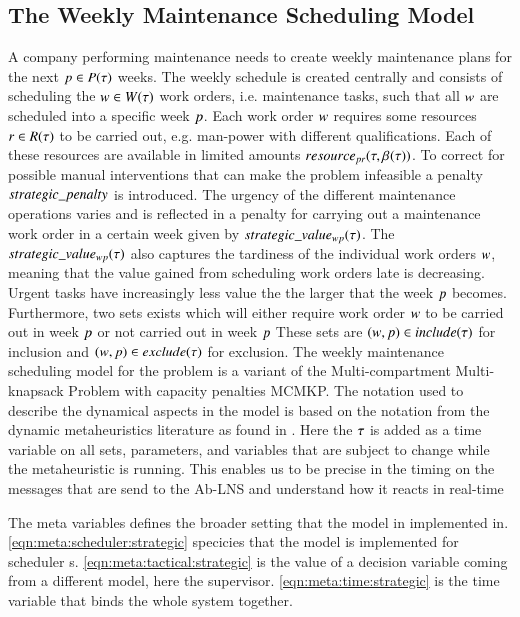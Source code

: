 \subsection{The Weekly Maintenance Scheduling Model}
A company performing maintenance needs to create weekly maintenance plans for
the next $p \in P(\tau)$ weeks. The weekly schedule is created
centrally and consists of scheduling the $\ElementWorkOrder \in \SetWorkOrder$
work orders, i.e. maintenance tasks, such that all $w$
are scheduled into a specific week $p$. Each work order $
w$ requires some resources $r \in R(\tau)$
to be carried out, e.g. man-power with different qualifications. Each of these
resources are available in limited amounts $resource_{pr}(\tau, \beta_{}(\tau))$. To correct
for possible manual interventions that can make the problem infeasible a penalty
$strategic\_penalty$ is introduced. The urgency of the different maintenance operations
varies and is reflected in a penalty for carrying out a maintenance work
order in a certain week given by $strategic\_value_{w p}(\tau)$. The $strategic\_value_{w p}(\tau)$ also 
captures the tardiness of the individual work orders $w$, meaning that
the value gained from scheduling work orders late is decreasing. Urgent tasks have
increasingly less value the the larger that the week $p$ becomes. 
Furthermore, two sets exists which will either require work order $w$ to be carried
out in week $p$ or not carried out in week $p$ 
These sets are $(w,p) \in
include(\tau)$ for inclusion and  $(w, p) \in
exclude(\tau)$ for exclusion. The weekly maintenance scheduling model for the problem 
is a variant of the  Multi-compartment Multi-knapsack Problem with capacity penalties MCMKP. 
The notation used to describe the dynamical aspects in the model is based on the notation 
from the dynamic metaheuristics literature as found in \cite{yangMetaheuristicsDynamicCombinatorial2013}. 
Here the $\tau$ is added as a time variable on all sets, parameters, and variables that are
subject to change while the metaheuristic is running. This enables us to be precise in the timing on 
the messages that are send to the Ab-LNS and understand how it reacts in real-time



The meta variables defines the broader setting that the model in implemented in.
\eqref{eqn:meta:scheduler:strategic} specicies that the model is
implemented for scheduler s. \eqref{eqn:meta:tactical:strategic} is the value
of a decision variable coming from a different model, here the supervisor. 
\eqref{eqn:meta:time:strategic} is the time variable that binds the whole 
system together. 

